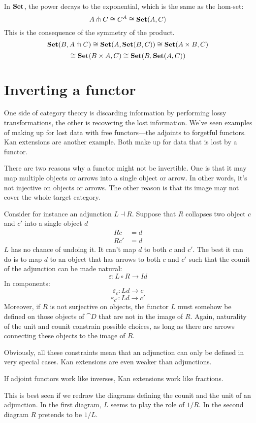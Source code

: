 \documentclass[DaoFP]{subfiles}
\begin{document}
In $\mathbf{Set}$, the power decays to the exponential, which is the same as the hom-set:
\[ A \pitchfork C \cong C^A \cong \mathbf{Set} (A, C) \]
This is the consequence of the symmetry of the product.
\[ \mathbf{Set}(B, A \pitchfork C) \cong \mathbf{Set} (A, \mathbf{Set}(B, C)) \cong \mathbf{Set} (A \times B, C) \]
\[ \cong \mathbf{Set} (B \times A, C) \cong \mathbf{Set} (B, \mathbf{Set} (A, C))\]

\section{Inverting a functor}

One side of category theory is discarding information by performing lossy transformations, the other is recovering the lost information. We've seen examples of making up for lost data with free functors---the adjoints to forgetful functors. Kan extensions are another example. Both make up for data that is lost by a functor.

There are two reasons why a functor might not be invertible. One is that it may map multiple objects or arrows into a single object or arrow. In other words, it's not injective on objects or arrows. The other reason is that its image may not cover the whole target category. 

Consider for instance an adjunction $L \dashv R$. Suppose that $R$ collapses two object $c$ and $c'$ into a single object $d$
\begin{align*}
R c &= d \\
R c' &= d
\end{align*}
$L$ has no chance of undoing it. It can't map $d$ to both $c$ and $c'$. The best it can do is to map $d$ to an object that has arrows to both $c$ and $c'$ such that the counit of the adjunction can be made natural:
\[ \varepsilon \colon L \circ R \to Id \]
In components:
\[ \varepsilon_c \colon L d \to c \]
\[ \varepsilon_{c'} \colon L d \to c' \]
Moreover, if $R$ is not surjective on objects, the functor $L$ must somehow be defined on those objects of $\cat D$ that are not in the image of $R$. Again, naturality of the unit and counit constrain possible choices, as long as there are arrows connecting these objects to the image of $R$. 

Obviously, all these constraints mean that an adjunction can only be defined in very special cases. Kan extensions are even weaker than adjunctions. 

If adjoint functors work like inverses, Kan extensions work like fractions. 

This is best seen if we redraw the diagrams defining the counit and the unit of an adjunction. In the first diagram, $L$ seems to play the role of $1/R$. In the second diagram $R$ pretends to be $1/L$.
\end{document}
